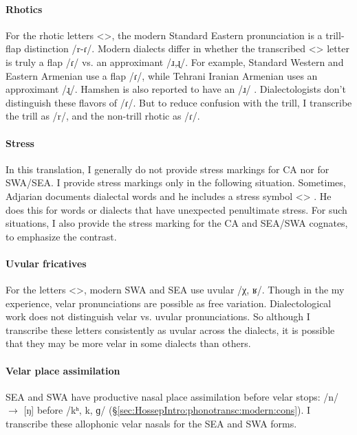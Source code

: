 	 
	 
\paragraph{Rhotics}
For the rhotic letters <>, the modern Standard Eastern pronunciation is a trill-flap distinction /r-ɾ/. Modern dialects differ in whether the transcribed <> letter is truly a flap /ɾ/ vs. an approximant /ɹ,ɻ/. For example, Standard Western and Eastern Armenian use a flap /ɾ/, while Tehrani Iranian Armenian uses an approximant /ɻ/. Hamshen is also reported to have an /ɹ/ \citep{Vaux-2007-HomshetsmaBook}. Dialectologists don't distinguish these flavors of /ɾ/. But to reduce confusion with the trill, I transcribe the trill as /r/, and the non-trill rhotic as /ɾ/. 


\paragraph{Stress}
In this translation, I generally do not provide stress markings for CA nor for SWA/SEA. I provide stress markings only in the following situation. Sometimes, Adjarian documents dialectal words and he includes a stress symbol <> . He does this for words or dialects that have unexpected penultimate stress. For such situations, I also provide the stress marking for the CA and SEA/SWA cognates, to emphasize the contrast. 


\paragraph{Uvular fricatives}
For the letters <>, modern SWA and SEA use uvular /χ, ʁ/. Though in the my experience, velar pronunciations are possible as free variation. Dialectological work does not distinguish velar vs. uvular pronunciations. So although I transcribe these letters consistently as uvular across the dialects, it is possible that they may be more velar in some dialects than others. 

\paragraph{Velar place assimilation}

SEA and SWA have productive nasal place assimilation before velar stops: /n/ $\rightarrow$ [ŋ] before /kʰ, k, ɡ/ (\S\ref{sec:HossepIntro:phonotransc:modern:cons}). I transcribe these allophonic velar nasals for the SEA and SWA forms. 

